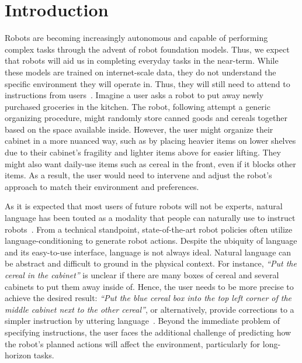 \section{Introduction}
Robots are becoming increasingly autonomous and capable of performing complex tasks through the advent of robot foundation models. Thus, we expect that robots will aid us in completing everyday tasks in the near-term. While these models are trained on internet-scale data, they do not understand the specific environment they will operate in. Thus, they will still need to attend to instructions from users~\cite{ajaykumar2021survey}. Imagine a user asks a robot to put away newly purchased groceries in the kitchen. The robot, following attempt a generic organizing procedure, might randomly store canned goods and cereals together based on the space available inside. However, the user might organize their cabinet in a more nuanced way, such as by placing heavier items on lower shelves due to their cabinet's fragility and lighter items above for easier lifting. They might also want daily-use items such as cereal in the front, even if it blocks other items. As a result, the user would need to intervene and adjust the robot’s approach to match their environment and preferences.

As it is expected that most users of future robots will not be experts, natural language has been touted as a modality that people can naturally use to instruct robots~\cite{tellex2020robots}. From a technical standpoint, state-of-the-art robot policies often utilize language-conditioning to generate robot actions. Despite the ubiquity of language and its easy-to-use interface, language is not always ideal. Natural language can be abstract and difficult to ground in the physical context. For instance, \textit{``Put the cereal in the cabinet'' }is unclear if there are many boxes of cereal and several cabinets to put them away inside of. Hence, the user needs to be more precise to achieve the desired result: \textit{``Put the blue cereal box into the top left corner of the middle cabinet next to the other cereal''}, or alternatively, provide corrections to a simpler instruction by uttering language~\cite{zha2023distilling}. Beyond the immediate problem of specifying instructions, the user faces the additional challenge of predicting how the robot's planned actions will affect the environment, particularly for long-horizon tasks.

